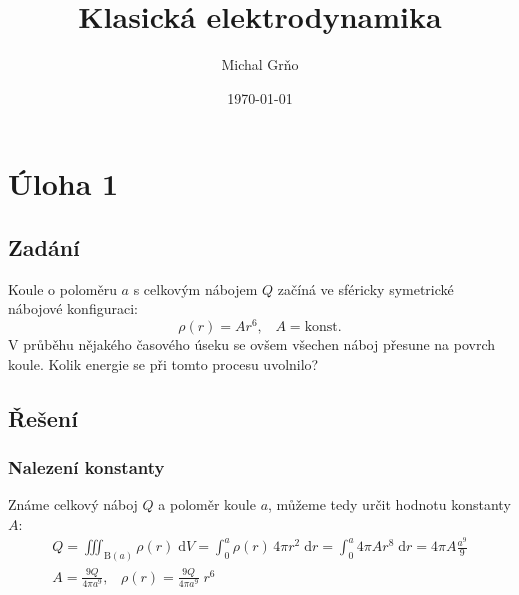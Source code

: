 \documentclass[10pt,a4paper]{article}
\newcommand{\const}[1]{\text{#1}}
\renewcommand{\d}[1]{\;\const{d}#1}
\begin{document}
\title{Klasická elektrodynamika}
\author{Michal Grňo}
\date{\today}

\maketitle

\section*{Úloha 1}

\subsection*{Zadání}
Koule o poloměru $a$ s celkovým nábojem $Q$ začíná ve sféricky symetrické nábojové konfiguraci: $$ \rho(r) = A r^6, \;\;\; A = \const{konst.} $$ V průběhu nějakého časového úseku se ovšem všechen náboj přesune na povrch koule. Kolik energie se při tomto procesu uvolnilo?

\subsection*{Řešení}
\subsubsection*{Nalezení konstanty}
Známe celkový náboj $Q$ a poloměr koule $a$, můžeme tedy určit hodnotu konstanty $A$:
\begin{gather*}
    Q = \iiint_{\const{B}(a)} \rho(r) \d{V}
    = \int_0^a \rho(r) \, 4\pi r^2 \d{r}
    = \int_0^a 4\pi A r^8 \d{r}
    = 4\pi A \frac{a^9}{9} \\[5pt]
    A = \frac{9Q}{4\pi a^9}, \;\;\;
    \rho(r) = \frac{9Q}{4\pi a^9} \; r^6
\end{gather*}
\end{document}
